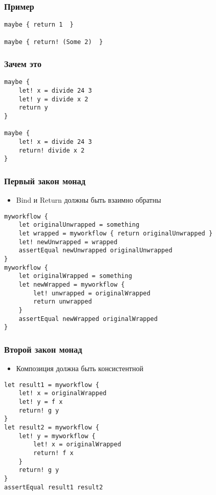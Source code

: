 \documentclass[xetex,mathserif,serif]{beamer}
\begin{document}
	\begin{frame}[fragile]
		\frametitle{Пример}
		\begin{verbatim}
maybe { return 1  }

maybe { return! (Some 2)  }
		\end{verbatim}
\end{frame}

	\begin{frame}[fragile]
		\frametitle{Зачем это}
		\begin{verbatim}
maybe {
    let! x = divide 24 3
    let! y = divide x 2
    return y 
}

maybe {
    let! x = divide 24 3
    return! divide x 2  
}
		\end{verbatim}
\end{frame}

	\begin{frame}[fragile]
		\frametitle{Первый закон монад}
		\begin{itemize}
			\item Bind и Return должны быть взаимно обратны
		\end{itemize}
		\begin{footnotesize}
			\begin{verbatim}
myworkflow {
    let originalUnwrapped = something
    let wrapped = myworkflow { return originalUnwrapped }
    let! newUnwrapped = wrapped
    assertEqual newUnwrapped originalUnwrapped 
}
myworkflow {
    let originalWrapped = something
    let newWrapped = myworkflow { 
        let! unwrapped = originalWrapped
        return unwrapped
    }
    assertEqual newWrapped originalWrapped
}
			\end{verbatim}
		\end{footnotesize}
\end{frame}

	\begin{frame}[fragile]
		\frametitle{Второй закон монад}
		\begin{itemize}
			\item Композиция должна быть консистентной
		\end{itemize}
		\begin{verbatim}
let result1 = myworkflow { 
    let! x = originalWrapped
    let! y = f x 
    return! g y  
}
let result2 = myworkflow { 
    let! y = myworkflow { 
        let! x = originalWrapped
        return! f x
    }
    return! g y
}
assertEqual result1 result2
		\end{verbatim}
\end{frame}
\end{document}
